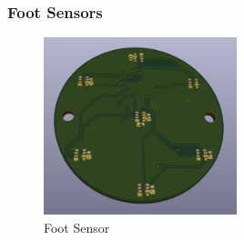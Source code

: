 \subsubsection{Foot Sensors}
\begin{figure}[H]
       \centering
       \includegraphics[width=0.5\textwidth]{figures/FootSensor.png}
       \caption{Foot Sensor}
       \label{fig:FootSensorPCB}
   \end{figure}
